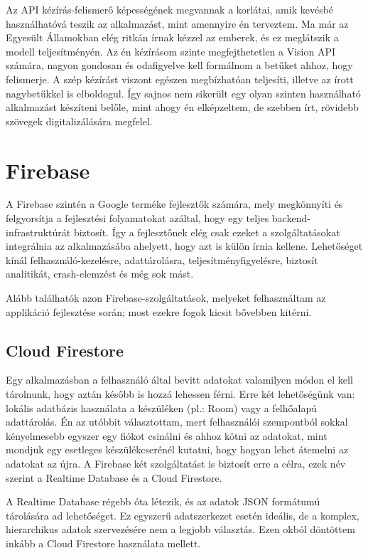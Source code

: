 Az API kézírás-felismerő képességének megvannak a korlátai, amik kevésbé használhatóvá teszik az alkalmazást, mint amennyire én terveztem. Ma már az Egyesült Államokban elég ritkán írnak kézzel az emberek, és ez meglátszik a modell teljesítményén. Az én kézírásom szinte megfejthetetlen a Vision API számára, nagyon gondosan és odafigyelve kell formálnom a betűket ahhoz, hogy felismerje. A szép kézírást viszont egészen megbízhatóan teljesíti, illetve az írott nagybetűkkel is elboldogul. Így sajnos nem sikerült egy olyan szinten használható alkalmazást készíteni belőle, mint ahogy én elképzeltem, de szebben írt, rövidebb szövegek digitalizálására megfelel.

\section{Firebase}

A Firebase szintén a Google terméke fejlesztők számára, mely megkönnyíti és felgyorsítja a fejlesztési folyamatokat azáltal, hogy egy teljes backend-infrastruktúrát biztosít. Így a fejlesztőnek elég csak ezeket a szolgáltatásokat integrálnia az alkalmazásába ahelyett, hogy azt is külön írnia kellene. Lehetőséget kínál felhasználó-kezelésre, adattárolásra, teljesítményfigyelésre, biztosít analitikát, crash-elemzést és még sok mást.


Alább találhatók azon Firebase-szolgáltatások, melyeket felhasználtam az applikáció fejlesztése során; most ezekre fogok kicsit bővebben kitérni.

\subsection{Cloud Firestore}
Egy alkalmazásban a felhasználó által bevitt adatokat valamilyen módon el kell tárolnunk, hogy aztán később is hozzá lehessen férni. Erre két lehetőségünk van: lokális adatbázis használata a készüléken (pl.: Room) vagy a felhőalapú adattárolás. Én az utóbbit választottam, mert felhasználói szempontból sokkal kényelmesebb egyszer egy fiókot csinálni és ahhoz kötni az adatokat, mint mondjuk egy esetleges készülékcserénél kutatni, hogy hogyan lehet átemelni az adatokat az újra. A Firebase két szolgáltatást is biztosít erre a célra, ezek név szerint a Realtime Database és a Cloud Firestore.

A Realtime Database régebb óta létezik, és az adatok JSON formátumú tárolására ad lehetőséget. Ez egyszerű adatszerkezet esetén ideális, de a komplex, hierarchikus adatok szervezésére nem a legjobb választás. Ezen okból döntöttem inkább a Cloud Firestore használata mellett.

